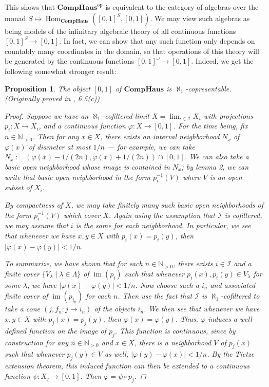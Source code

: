 \documentclass[a4paper,12pt,reqno]{amsart}
\newtheorem{proposition}{Proposition}
\newcommand{\Hom}{\operatorname{Hom}}
\newcommand{\op}{\operatorname{op}}
\newcommand{\CompHaus}{\mathbf{CompHaus}}
\newcommand{\im}{\operatorname{im}}
\newcommand{\I}{\mathcal{I}}
\newcommand{\INnz}{\mathbb{N}_{>0}}
\begin{document}
This shows that $\CompHaus^{\op}$ is equivalent to the category of algebras over the monad $S \mapsto \Hom_{\CompHaus}([0, 1]^S, [0, 1])$. We may view such algebras as being models of the infinitary algebraic theory of all continuous functions $[0,1]^S \to [0,1]$. In fact, we can show that any such function only depends on countably many coordinates in the domain, so that operations of this theory will be generated by the continuous functions $[0,1]^\omega \to [0,1]$. Indeed, we get the following somewhat stronger result:

\begin{proposition}
	The object $[0,1]$ of $\CompHaus$ is $\aleph_1$-copresentable. (Originally proved in \cite{GU71}, 6.5(c))
	
	\begin{proof}
		Suppose we have an $\aleph_1$-cofiltered limit $X = \lim_{i\in \I} X_i$ with projections $p_i : X \to X_i$, and a continuous function $\varphi : X \to [0,1]$. For the time being, fix $n\in \INnz$. Then for any $x\in X$, there exists an interval neighborhood $N_x$ of $\varphi(x)$ of diameter at most $1/n$ --- for example, we can take $N_x := (\varphi(x) - 1/(2n), \varphi(x) + 1/(2n)) \cap [0,1]$. We can also take a basic open neighborhood whose image is contained in $N_x$; by lemma 2, we can write that basic open neighborhood in the form $p_i^{-1}(V)$ where $V$ is an open subset of $X_i$.
		
		By compactness of $X$, we may take finitely many such basic open neighborhoods of the form $p_i^{-1}(V)$ which cover $X$. Again using the assumption that $\I$ is cofiltered, we may assume that $i$ is the same for each neighborhood. In particular, we see that whenever we have $x, y\in X$ with $p_i(x) = p_i(y)$, then $|\varphi(x) - \varphi(y)| < 1/n$.
		
		To summarize, we have shown that for each $n \in \INnz$, there exists $i \in \I$ and a finite cover $\{ V_\lambda \mid \lambda \in \Lambda \}$ of $\im(p_i)$ such that whenever $p_i(x), p_i(y) \in V_\lambda$ for some $\lambda$, we have $|\varphi(x) - \varphi(y)| < 1/n$. Now choose such a $i_n$ and associated finite cover of $\im(p_{i_n})$ for each $n$. Then use the fact that $\I$ is $\aleph_1$-cofiltered to take a cone $(j, f_n : j \to i_n)$ of the objects $i_n$. We then see that whenever we have $x, y\in X$ with $p_j(x) = p_j(y)$, then $\varphi(x) = \varphi(y)$. Thus, $\varphi$ induces a well-defined function on the image of $p_j$. This function is continuous, since by construction for any $n\in \INnz$ and $x \in X$, there is a neighborhood $V$ of $p_j(x)$ such that whenever $p_j(y)\in V$ as well, $|\varphi(y) - \varphi(x)| < 1/n$. By the Tietze extension theorem, this induced function can then be extended to a continuous function $\psi : X_j \to [0,1]$. Then $\varphi = \psi \circ p_j$.
		

\end{proof}
\end{proposition}
\end{document}
